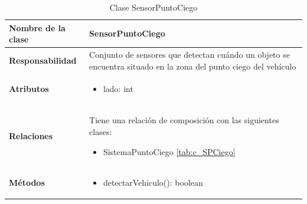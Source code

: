 \begin{table}[h]
\begin{center}
\begin{tabular}{p{} p{11cm}}
\textbf{Nombre de la clase} &  SensorPuntoCiego\\ \hline \hline
\textbf{Responsabilidad} &  Conjunto de sensores que detectan cuándo un objeto se encuentra situado en la zona del punto ciego del vehículo\\ \hline
\textbf{Atributos} &  \begin{itemize} \item lado: int \end{itemize}\\ \hline
\textbf{Relaciones} & \par Tiene una relación de composición con las siguientes clases:
                      \begin{itemize}
                        \item SistemaPuntoCiego \ref{tab:c_SPCiego}
                      \end{itemize}
                      \\ \hline

\textbf{Métodos} &  \begin{itemize}
                      \item detectarVehiculo(): boolean
                    \end{itemize}\\ \hline
\end{tabular}
\caption{Clase SensorPuntoCiego}
\label{tab:c_SensorPC}
\end{center}
\end{table}







